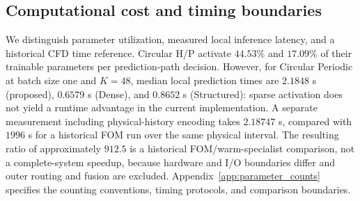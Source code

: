 \subsection{Computational cost and timing boundaries}
\label{sec:exp_cost}

We distinguish parameter utilization, measured local inference latency,
and a historical CFD time reference. Circular H/P activate $44.53\%$
and $17.09\%$ of their trainable parameters per prediction-path decision.
However, for Circular Periodic at batch size one and $K=48$, median
local prediction times are $2.1848$ s (proposed), $0.6579$ s (Dense),
and $0.8652$ s (Structured): sparse activation does not yield a runtime
advantage in the current implementation.
A separate measurement including physical-history encoding takes
$2.18747$ s, compared with $1996$ s for a historical FOM run over the
same physical interval. The resulting ratio of approximately $912.5$
is a historical FOM/warm-specialist comparison, not a complete-system
speedup, because hardware and I/O boundaries differ and outer routing
and fusion are excluded. Appendix~\ref{app:parameter_counts} specifies
the counting conventions, timing protocols, and comparison boundaries.
